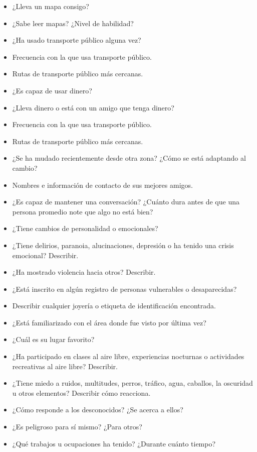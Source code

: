 \begin{itemize}
    \item ¿Lleva un mapa consigo?
    \item ¿Sabe leer mapas? ¿Nivel de habilidad?
    \item ¿Ha usado transporte público alguna vez?
    \item Frecuencia con la que usa transporte público.
    \item Rutas de transporte público más cercanas.
    \item ¿Es capaz de usar dinero?
    \item ¿Lleva dinero o está con un amigo que tenga dinero?
    \item Frecuencia con la que usa transporte público.
    \item Rutas de transporte público más cercanas.
    \item ¿Se ha mudado recientemente desde otra zona? ¿Cómo se está adaptando al cambio?
    \item Nombres e información de contacto de sus mejores amigos.
    \item ¿Es capaz de mantener una conversación? ¿Cuánto dura antes de que una persona promedio note que algo no está bien?
    \item ¿Tiene cambios de personalidad o emocionales?
    \item ¿Tiene delirios, paranoia, alucinaciones, depresión o ha tenido una crisis emocional? Describir.
    \item ¿Ha mostrado violencia hacia otros? Describir.
    \item ¿Está inscrito en algún registro de personas vulnerables o desaparecidas?
    \item Describir cualquier joyería o etiqueta de identificación encontrada.
    \item ¿Está familiarizado con el área donde fue visto por última vez?
    \item ¿Cuál es su lugar favorito?
    \item ¿Ha participado en clases al aire libre, experiencias nocturnas o actividades recreativas al aire libre? Describir.
    \item ¿Tiene miedo a ruidos, multitudes, perros, tráfico, agua, caballos, la oscuridad u otros elementos? Describir cómo reacciona.
    \item ¿Cómo responde a los desconocidos? ¿Se acerca a ellos?
    \item ¿Es peligroso para sí mismo? ¿Para otros?
    \item ¿Qué trabajos u ocupaciones ha tenido? ¿Durante cuánto tiempo?

\end{itemize}

